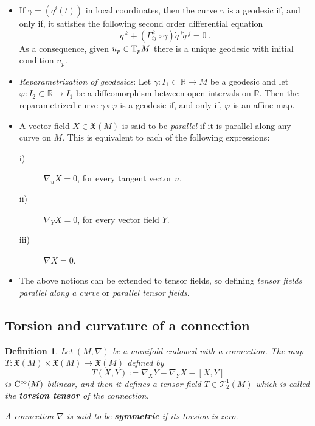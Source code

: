 \documentclass[12pt]{report}
\newtheorem{definition}[teor]{Definition}
\def\vf{\mathfrak X}
\def\Real{\mathbb{R}}
\def\Tan{{\rm T}}
\def\Cinfty{{\rm C}^\infty}
\begin{document}
\begin{itemize}
  \item
If $\gamma=(q^i(t))$ in local coordinates,
then the curve $\gamma$ is a geodesic if, and only if,
it satisfies the following second order differential equation
$$
\ddot{q}\,^k+(\Gamma_{ij}^k\circ\gamma)\dot{q}\,^i\dot{q}\,^j=0\ .
$$  
As a consequence, given $u_p\in\Tan_pM$ there is a unique geodesic with initial condition $u_p$.	
\item 
{\sl Reparametrization of geodesics}: 
Let $\gamma\colon I_1\subset\Real\to M$ be a geodesic and 
let $\varphi\colon I_2\subset\Real\to I_1$ be a diffeomorphism 
between open intervals on $\Real$. 
Then the reparametrized curve $\gamma\circ\varphi$ is a geodesic
if, and only if, $\varphi$ is an affine map. 
\item
A vector field $X\in\vf(M)$ is said to be {\sl parallel} 
if it is parallel along any curve on $M$. 
This is equivalent to each of the following expressions:
\begin{description}
  \item[i)] $\nabla_uX=0$, for every tangent vector $u$.
  \item[ii)] $\nabla_YX=0$, for every vector field $Y$. 
  \item[iii)] $\nabla X=0$.
\end{description}
\item 
The above notions can be extended to tensor fields,
so defining {\sl tensor fields parallel along a curve} 
or {\sl parallel tensor fields}.
\end{itemize}


\subsection{Torsion and curvature of a connection}


\begin{definition}
Let $(M,\nabla)$ be a manifold endowed with a connection.
The map ${\mathit T}\colon\vf(M)\times\vf(M)\to\vf(M)$ 
defined by
 $$
 {\mathit T}(X,Y):=\nabla_XY-\nabla_YX-[X,Y]
 $$
is $\Cinfty(M)$-bilinear, and then it defines a tensor field 
${\mathit T}\in{\mathcal T}_2^1(M)$ which is called 
the \textbf{torsion tensor} of the connection. 

A connection $\nabla$ is said to be \textbf{symmetric} if its torsion is zero.
\end{definition}
\end{document}
